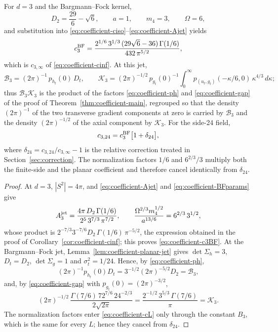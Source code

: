 \begin{corollary}\label{cor:coefficient-BF}
For $d=3$ and the Bargmann--Fock kernel,
\begin{equation}\label{eq:coefficient-BFparams}
D_2=\frac{29}{6}-\sqrt6,\qquad a=1,\qquad m_4=3,\qquad \Omega=6,
\end{equation}
and substitution into \eqref{eq:coefficient-ciso}--\eqref{eq:coefficient-Ajet} yields
\begin{equation}\label{eq:coefficient-c3BF}
c_3^{\rm BF}=\frac{2^{1/6}\,3^{1/3}\,(29\sqrt6-36)\,\Gamma(1/6)}{432\,\pi^{5/2}},
\end{equation}
which is $c_{3,\infty}$ of \eqref{eq:coefficient-cinf}. At this jet,
\[
\mathcal B_3=(2\pi)^{-1}\,p_{h_t}(0)\,D_t,\qquad
\mathcal K_3=(2\pi)^{-1/2}\,p_{g_t}(0)^{-1}\int_0^\infty p_{(u_t,g_t)}(-\kappa/6,0)\,\kappa^{4/3}\,d\kappa ;
\]
thus $\mathcal B_3\mathcal K_3$ is the product of the factors \eqref{eq:coefficient-ph} and \eqref{eq:coefficient-gap} of the proof of Theorem~\ref{thm:coefficient-main}, regrouped so that the density $(2\pi)^{-1}$ of the two transverse gradient components at zero is carried by $\mathcal B_3$ and the density $(2\pi)^{-1/2}$ of the axial component by $\mathcal K_3$. For the side-24 field,
\begin{equation}\label{eq:coefficient-delta24}
c_{3,24}=c_3^{\rm BF}\bigl[1+\delta_{24}\bigr],
\end{equation}
where $\delta_{24}=c_{3,24}/c_{3,\infty}-1$ is the relative correction treated in Section~\ref{sec:correction}. The normalization factors $1/6$ and $6^{2/3}/3$ multiply both the finite-side and the planar coefficient and therefore cancel identically from $\delta_{24}$.
\end{corollary}

\begin{proof}
At $d=3$, $|S^2|=4\pi$, and \eqref{eq:coefficient-Ajet} and \eqref{eq:coefficient-BFparams} give
\[
A_3^{\rm jet}=\frac{4\pi\,D_2\,\Gamma(1/6)}{2^5\,3^{7/3}\,\pi^{7/2}},\qquad \frac{\Omega^{2/3}m_4^{1/2}}{a^{13/6}}=6^{2/3}\,3^{1/2},
\]
whose product is $2^{-7/3}3^{-7/6}D_2\,\Gamma(1/6)\,\pi^{-5/2}$, the expression obtained in the proof of Corollary~\ref{cor:coefficient-cinf}; this proves \eqref{eq:coefficient-c3BF}. At the Bargmann--Fock jet, Lemma~\ref{lem:coefficient-planar-jet} gives $\det\Sigma_h=3$, $D_t=D_2$, $\det\Sigma_g=1$ and $\sigma_t^2=1/24$. Hence, by \eqref{eq:coefficient-ph},
\[
(2\pi)^{-1}p_{h_t}(0)D_t=3^{-1/2}(2\pi)^{-5/2}D_2=\mathcal B_3,
\]
and, by \eqref{eq:coefficient-gap} with $p_{g_t}(0)=(2\pi)^{-3/2}$,
\[
(2\pi)^{-1/2}\,\frac{\Gamma(7/6)\,72^{7/6}\,24^{-2/3}}{2\sqrt{2\pi}}=\frac{2^{-1/2}\,3^{5/3}\,\Gamma(7/6)}{\pi}=\mathcal K_3 .
\]
The normalization factors enter \eqref{eq:coefficient-cL} only through the constant $B_3$, which is the same for every $L$; hence they cancel from $\delta_{24}$.
\end{proof}

